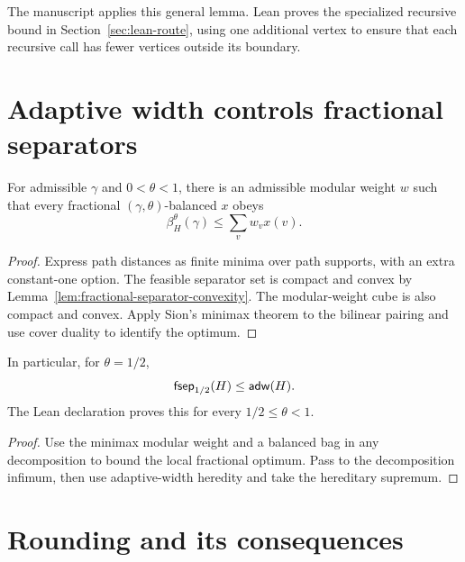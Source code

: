 The manuscript applies this general lemma. Lean proves the specialized
recursive bound in Section~\ref{sec:lean-route}, using one additional vertex
to ensure that each recursive call has fewer vertices outside its boundary.

\section{Adaptive width controls fractional separators}

\begin{lemma}
\label{lem:cover-minimax}
\leanok
For admissible $\gamma$ and $0<\theta<1$, there is an admissible modular
weight $w$ such that every fractional $(\gamma,\theta)$-balanced $x$ obeys
\[
 \beta_H^\theta(\gamma)\le\sum_v w_vx(v).
\]
\end{lemma}
\begin{proof}\leanok
Express path distances as finite minima over path supports, with an extra
constant-one option. The feasible separator set is compact and convex by
Lemma~\ref{lem:fractional-separator-convexity}. The modular-weight cube is
also compact and convex. Apply Sion's minimax theorem to the bilinear pairing
and use cover duality to identify the optimum.
\end{proof}

\begin{lemma}
\label{thm:fsep-adw}
\leanok
In particular, for $\theta=1/2$,
\[
 \mathsf{fsep}_{1/2}(H)\le\mathsf{adw}(H).
\]
The Lean declaration proves this for every $1/2\le\theta<1$.
\end{lemma}
\begin{proof}\leanok
Use the minimax modular weight and a balanced bag in any decomposition to
bound the local fractional optimum. Pass to the decomposition infimum, then
use adaptive-width heredity and take the hereditary supremum.
\end{proof}

\section{Rounding and its consequences}
\label{sec:rounding}

